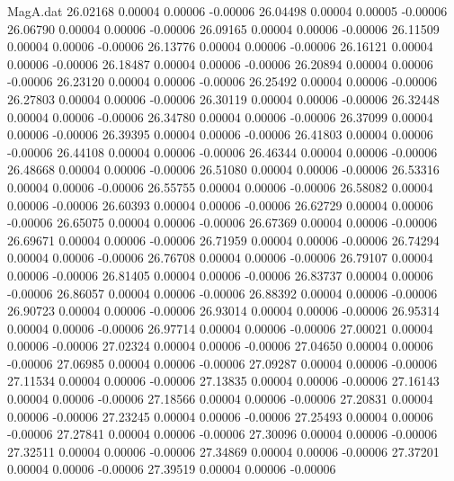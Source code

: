 \begin{filecontents}{MagA.dat}
  26.02168    0.00004    0.00006   -0.00006
  26.04498    0.00004    0.00005   -0.00006
  26.06790    0.00004    0.00006   -0.00006
  26.09165    0.00004    0.00006   -0.00006
  26.11509    0.00004    0.00006   -0.00006
  26.13776    0.00004    0.00006   -0.00006
  26.16121    0.00004    0.00006   -0.00006
  26.18487    0.00004    0.00006   -0.00006
  26.20894    0.00004    0.00006   -0.00006
  26.23120    0.00004    0.00006   -0.00006
  26.25492    0.00004    0.00006   -0.00006
  26.27803    0.00004    0.00006   -0.00006
  26.30119    0.00004    0.00006   -0.00006
  26.32448    0.00004    0.00006   -0.00006
  26.34780    0.00004    0.00006   -0.00006
  26.37099    0.00004    0.00006   -0.00006
  26.39395    0.00004    0.00006   -0.00006
  26.41803    0.00004    0.00006   -0.00006
  26.44108    0.00004    0.00006   -0.00006
  26.46344    0.00004    0.00006   -0.00006
  26.48668    0.00004    0.00006   -0.00006
  26.51080    0.00004    0.00006   -0.00006
  26.53316    0.00004    0.00006   -0.00006
  26.55755    0.00004    0.00006   -0.00006
  26.58082    0.00004    0.00006   -0.00006
  26.60393    0.00004    0.00006   -0.00006
  26.62729    0.00004    0.00006   -0.00006
  26.65075    0.00004    0.00006   -0.00006
  26.67369    0.00004    0.00006   -0.00006
  26.69671    0.00004    0.00006   -0.00006
  26.71959    0.00004    0.00006   -0.00006
  26.74294    0.00004    0.00006   -0.00006
  26.76708    0.00004    0.00006   -0.00006
  26.79107    0.00004    0.00006   -0.00006
  26.81405    0.00004    0.00006   -0.00006
  26.83737    0.00004    0.00006   -0.00006
  26.86057    0.00004    0.00006   -0.00006
  26.88392    0.00004    0.00006   -0.00006
  26.90723    0.00004    0.00006   -0.00006
  26.93014    0.00004    0.00006   -0.00006
  26.95314    0.00004    0.00006   -0.00006
  26.97714    0.00004    0.00006   -0.00006
  27.00021    0.00004    0.00006   -0.00006
  27.02324    0.00004    0.00006   -0.00006
  27.04650    0.00004    0.00006   -0.00006
  27.06985    0.00004    0.00006   -0.00006
  27.09287    0.00004    0.00006   -0.00006
  27.11534    0.00004    0.00006   -0.00006
  27.13835    0.00004    0.00006   -0.00006
  27.16143    0.00004    0.00006   -0.00006
  27.18566    0.00004    0.00006   -0.00006
  27.20831    0.00004    0.00006   -0.00006
  27.23245    0.00004    0.00006   -0.00006
  27.25493    0.00004    0.00006   -0.00006
  27.27841    0.00004    0.00006   -0.00006
  27.30096    0.00004    0.00006   -0.00006
  27.32511    0.00004    0.00006   -0.00006
  27.34869    0.00004    0.00006   -0.00006
  27.37201    0.00004    0.00006   -0.00006
  27.39519    0.00004    0.00006   -0.00006

\end{filecontents}
